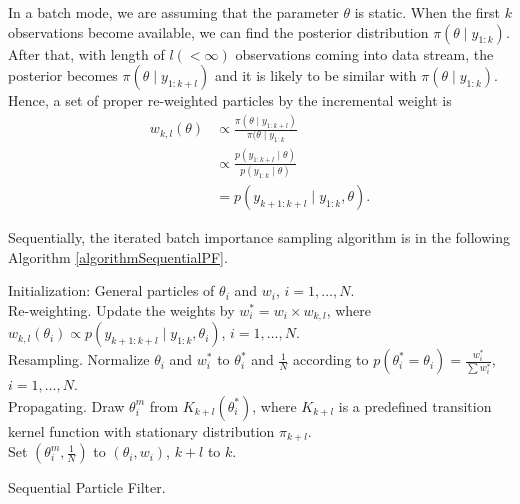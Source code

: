 In a batch mode, we are assuming that the parameter $\theta$ is static. When the first $k$ observations become available, we can find the posterior distribution $\pi(\theta\mid y_{1:k})$. After that, with length of $l (<\infty)$ observations coming into data stream, the posterior becomes $\pi(\theta\mid y_{1:k+l})$ and it is likely to be similar with $\pi(\theta\mid y_{1:k})$.  Hence, a set of proper re-weighted particles by the incremental weight is 
\begin{align*}
w_{k,l}(\theta) &\propto \frac{\pi(\theta\mid y_{1:k+l}) }{\pi(\theta\mid y_{1:k}} \\
&\propto \frac{p(y_{1:k+l}\mid \theta) }{p(y_{1:k}\mid\theta)} \\
&=p(y_{k+1:k+l}\mid y_{1:k},\theta). 
\end{align*}

Sequentially, the iterated batch importance sampling algorithm is in the following Algorithm \ref{algorithmSequentialPF}. 
\begin{algorithm}[h]
\SetAlgoLined 
Initialization:  General particles of $\theta_i$ and $w_i$, $i=1,\ldots,N$.\\
 {Re-weighting. Update the weights by $w_i^*=w_i \times w_{k,l}$, where $w_{k,l}(\theta_i)\propto p(y_{k+1:k+l}\mid y_{1:k},\theta_i)$, $i=1,\ldots,N$. \\
Resampling. Normalize $\theta_i$ and $w^*_i$ to $\theta_i^*$ and $\frac{1}{N}$ according to $p(\theta_i^*=\theta_i)=\frac{w_i^*}{\sum w_i^*}$,  $i=1,\ldots,N$. \\
Propagating. Draw $\theta_i^m$ from $K_{k+l}(\theta_i^*)$, where $K_{k+l}$ is a predefined transition kernel function with stationary distribution $\pi_{k+l}$.\\
Set $(\theta_i^m,\frac{1}{N})$ to $(\theta_i,w_i)$, $k+l$ to $k$.}
 \caption{Sequential Particle Filter.}\label{algorithmSequentialPF}
\end{algorithm}

